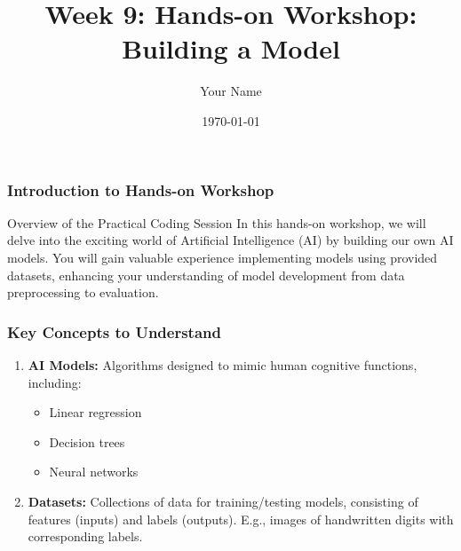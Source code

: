 \documentclass{beamer}
\title{Week 9: Hands-on Workshop: Building a Model}
\author{Your Name}
\institute{Your Institution}
\date{\today}
\begin{document}
\frame{\titlepage}

\begin{frame}[fragile]
    \frametitle{Introduction to Hands-on Workshop}
    \begin{block}{Overview of the Practical Coding Session}
        In this hands-on workshop, we will delve into the exciting world of Artificial Intelligence (AI) by building our own AI models. 
        You will gain valuable experience implementing models using provided datasets, enhancing your understanding of model development from data preprocessing to evaluation.
    \end{block}
\end{frame}

\begin{frame}[fragile]
    \frametitle{Key Concepts to Understand}
    \begin{enumerate}
        \item \textbf{AI Models:} Algorithms designed to mimic human cognitive functions, including:
        \begin{itemize}
            \item Linear regression
            \item Decision trees
            \item Neural networks
        \end{itemize}
        
        \item \textbf{Datasets:} Collections of data for training/testing models, consisting of features (inputs) and labels (outputs). E.g., images of handwritten digits with corresponding labels.
    \end{enumerate}
\end{frame}
\end{document}
